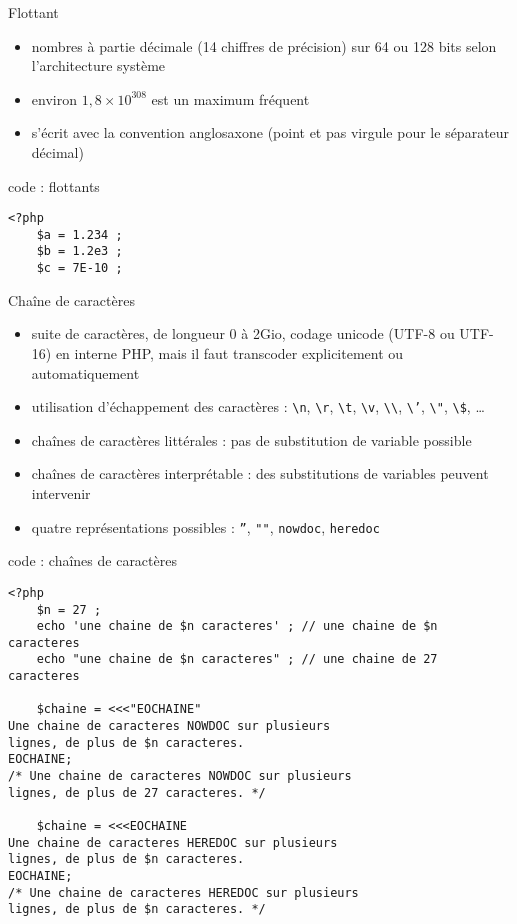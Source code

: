\begin{frame}[containsverbatim]{Flottant}
\begin{itemize}
\item nombres à partie décimale (14 chiffres de précision) sur 64 ou 128 bits selon l'architecture système
\item environ $1,8 \times 10^{308}$ est un maximum fréquent
\item s'écrit avec la convention anglosaxone (point et pas virgule pour le séparateur décimal)  
\end{itemize}
\begin{block}{code : flottants}
\begin{lstlisting}
<?php
	$a = 1.234 ;
	$b = 1.2e3 ;
	$c = 7E-10 ;
\end{lstlisting}
\end{block}
\end{frame}

\begin{frame}[containsverbatim]{Chaîne de caractères}
\begin{itemize}
\item suite de caractères, de longueur 0 à 2Gio, codage unicode (UTF-8 ou UTF-16) en interne PHP, mais il faut transcoder explicitement ou automatiquement
\item utilisation d'échappement des caractères : \texttt{\textbackslash{}n}, \texttt{\textbackslash{}r}, \texttt{\textbackslash{}t}, \texttt{\textbackslash{}v}, \texttt{\textbackslash{}\textbackslash{}}, \texttt{\textbackslash{}'}, \texttt{\textbackslash{}"}, \texttt{\textbackslash{}\$}, \ldots
\item chaînes de caractères littérales : pas de substitution de variable possible
\item chaînes de caractères interprétable : des substitutions de variables peuvent intervenir
\item quatre représentations possibles : \texttt{''}, \texttt{""}, \texttt{nowdoc}, \texttt{heredoc}
\end{itemize}
\begin{block}{code : chaînes de caractères}
\begin{lstlisting}
<?php
	$n = 27 ;
	echo 'une chaine de $n caracteres' ; // une chaine de $n caracteres
	echo "une chaine de $n caracteres" ; // une chaine de 27 caracteres
	
	$chaine = <<<"EOCHAINE"
Une chaine de caracteres NOWDOC sur plusieurs
lignes, de plus de $n caracteres.
EOCHAINE;
/* Une chaine de caracteres NOWDOC sur plusieurs
lignes, de plus de 27 caracteres. */

	$chaine = <<<EOCHAINE
Une chaine de caracteres HEREDOC sur plusieurs
lignes, de plus de $n caracteres.
EOCHAINE;
/* Une chaine de caracteres HEREDOC sur plusieurs
lignes, de plus de $n caracteres. */
\end{lstlisting}
\end{block}
\end{frame}

